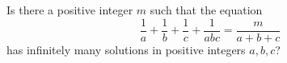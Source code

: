 Is there a positive integer $m$ such that the equation
\[ \frac{1}{a} + \frac{1}{b} + \frac{1}{c} + \frac{1}{abc} = \frac{m}{a+b+c} \]
has infinitely many solutions in positive integers $a, b, c$?
